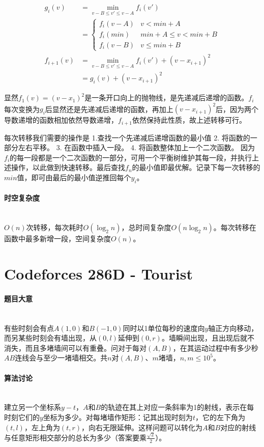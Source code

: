 \documentclass[UTF8]{ctexart}
\newcommand{\myparagraph}[1]{\paragraph{#1}\mbox{}\\}
\theoremstyle{nonumberplain}
\begin{document}
			$$\begin{aligned}
				g_i(v)&=\min_{v-B \leq v' \leq v-A}f_i(v')\\
				      &=\begin{cases}
				           f_i(v-A) & v < min+A \\
						   f_i(min) & min+A \leq v < min+B \\
						   f_i(v-B) & v \leq min+B
						\end{cases} \\
				f_{i+1}(v)&=\min_{v-B \leq v' \leq v-A}f_i(v')+(v-x_{i+1})^2 \\
				          &=g_i(v)+(v-x_{i+1})^2
			\end{aligned}$$
			
			显然$f_1(v)=(v-x_1)^2$是一条开口向上的抛物线，是先递减后递增的函数。$f_i$每次变换为$g_i$后显然还是先递减后递增的函数，再加上$(v-x_{i+1})^2$后，因为两个导数递增的函数相加依然导数递增，$f_{i+1}$依然保持此性质，故上述转移可行。
			
			每次转移我们需要的操作是 1.查找一个先递减后递增函数的最小值 2. 将函数的一部分左右平移。 3. 在函数中插入一段。 4. 将函数整体加上一个二次函数。 因为$f_i$的每一段都是一个二次函数的一部分，可用一个平衡树维护其每一段，并执行上述操作，以此做到快速转移。最后查找$f_n$的最小值即最优解。记录下每一次转移的$min$值，即可由最后的最小值逆推回每个$y_i$。
			
		\myparagraph{时空复杂度}
		
			$O(n)$次转移，每次耗时$O(\log_2n)$，总时间复杂度$O(n\log_2n)$。每次转移在函数中最多新增一段，空间复杂度$O(n)$。
	
	\section{Codeforces 286D - Tourist}
	
		\myparagraph{题目大意}
		
			有些时刻会有点$A(1,0)$和$B(-1,0)$同时以1单位每秒的速度向$y$轴正方向移动，而另某些时刻会有墙出现，从$(0,l)$延伸到$(0,r)$。墙瞬间出现，且出现后就不消失，而且多堵墙间可以有重叠。问对于每对$(A,B)$，在其运动过程中有多少秒$AB$连线会与至少一堵墙相交。共$n$对$(A,B)$、$m$堵墙，$n,m \leq 10^5$。
		
		\myparagraph{算法讨论}
		
			建立另一个坐标系$y-t$，$A$和$B$的轨迹在其上对应一条斜率为1的射线，表示在每时刻它们的$y$坐标为多少。对每堵墙作矩形：记其出现时刻为$t$，它的左下角为$(t,l)$，左上角为$(t,r)$，向右无限延伸。这样问题可以转化为$A$和$B$对应的射线与任意矩形相交部分的总长为多少（答案要乘$\frac{\sqrt{2}}{2}$）。
			
\end{document}
